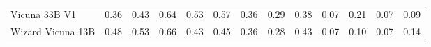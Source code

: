 \begin{table}[!htbp]
\begin{tabular}{l|rrrr|rrrr|rrrr}
Vicuna 33B V1 & {\cellcolor[HTML]{DBF1A4}} \color[HTML]{000000} 0.36 & {\cellcolor[HTML]{BEE596}} \color[HTML]{000000} 0.43 & {\cellcolor[HTML]{58B669}} \color[HTML]{F1F1F1} 0.64 & {\cellcolor[HTML]{8ED082}} \color[HTML]{000000} 0.53 & {\cellcolor[HTML]{CB0A22}} \color[HTML]{F1F1F1} 0.57 & {\cellcolor[HTML]{FD8038}} \color[HTML]{F1F1F1} 0.36 & {\cellcolor[HTML]{FEA446}} \color[HTML]{000000} 0.29 & {\cellcolor[HTML]{FD7435}} \color[HTML]{F1F1F1} 0.38 & {\cellcolor[HTML]{FECE65}} \color[HTML]{000000} 0.07 & {\cellcolor[HTML]{662506}} \color[HTML]{F1F1F1} 0.21 & {\cellcolor[HTML]{FECE65}} \color[HTML]{000000} 0.07 & {\cellcolor[HTML]{FEB643}} \color[HTML]{000000} 0.09 \\
Wizard Vicuna 13B & {\cellcolor[HTML]{A7DB8C}} \color[HTML]{000000} 0.48 & {\cellcolor[HTML]{8ED082}} \color[HTML]{000000} 0.53 & {\cellcolor[HTML]{4FB264}} \color[HTML]{F1F1F1} 0.66 & {\cellcolor[HTML]{BEE596}} \color[HTML]{000000} 0.43 & {\cellcolor[HTML]{F74327}} \color[HTML]{F1F1F1} 0.45 & {\cellcolor[HTML]{FD8038}} \color[HTML]{F1F1F1} 0.36 & {\cellcolor[HTML]{FEAB49}} \color[HTML]{000000} 0.28 & {\cellcolor[HTML]{FC4F2A}} \color[HTML]{F1F1F1} 0.43 & {\cellcolor[HTML]{FECE65}} \color[HTML]{000000} 0.07 & {\cellcolor[HTML]{FE9829}} \color[HTML]{000000} 0.10 & {\cellcolor[HTML]{FECE65}} \color[HTML]{000000} 0.07 & {\cellcolor[HTML]{E1640E}} \color[HTML]{F1F1F1} 0.14 \\

\bottomrule
\end{tabular}
\setlength{\tabcolsep}{6pt}
\end{table}